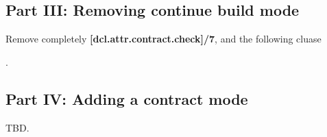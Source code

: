 \subsection{Part III: Removing continue build mode}

Remove completely \textbf{[dcl.attr.contract.check]/7}, and the
following cluase

\begin{flushright}
\begin{minipage}[t]{0.9\textwidth}
.
\end{minipage}
\end{flushright}

\subsection{Part IV: Adding a contract mode}

TBD.
